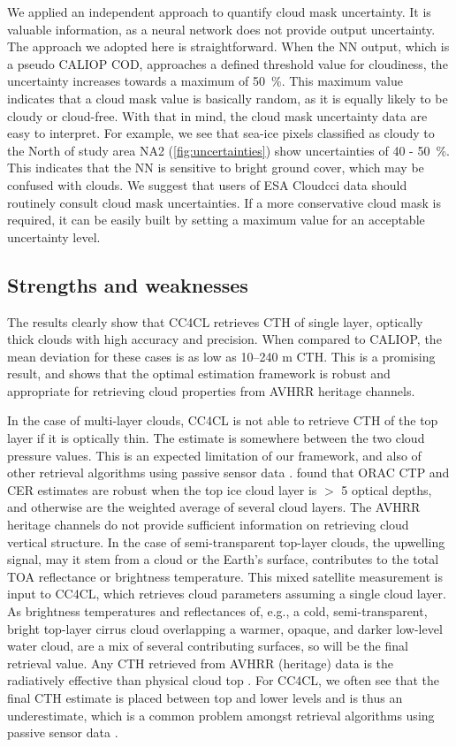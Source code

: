 We applied an independent approach to quantify cloud mask uncertainty. It is valuable information, as a neural network does not provide output uncertainty. The approach we adopted here is straightforward. When the NN output, which is a pseudo CALIOP COD, approaches a defined threshold value for cloudiness, the uncertainty increases towards a maximum of 50~\%. This maximum value indicates that a cloud mask value is basically random, as it is equally likely to be cloudy or cloud-free. With that in mind, the cloud mask uncertainty data are easy to interpret. For example, we see that sea-ice pixels classified as cloudy to the North of study area NA2 (\cref{fig:uncertainties}) show uncertainties of 40 - 50~\%. This indicates that the NN is sensitive to bright ground cover, which may be confused with clouds. We suggest that users of ESA Cloud\textunderscore cci data should routinely consult cloud mask uncertainties. If a more conservative cloud mask is required, it can be easily built by setting a maximum value for an acceptable uncertainty level.

\subsection{Strengths and weaknesses}

The results clearly show that CC4CL retrieves CTH of single layer, optically thick clouds with high accuracy and precision. When compared to CALIOP, the mean deviation for these cases is as low as 10--240 m CTH. This is a promising result, and shows that the optimal estimation framework is robust and appropriate for retrieving cloud properties from AVHRR heritage channels. 

In the case of multi-layer clouds, CC4CL is not able to retrieve CTH of the top layer if it is optically thin. The estimate is somewhere between the two cloud pressure values. This is an expected limitation of our framework, and also of other retrieval algorithms using passive sensor data \citep{Holz08,Karlsson10}. \citet{Poulsen12} found that ORAC CTP and CER estimates are robust when the top ice cloud layer is $>$ 5 optical depths, and otherwise are the weighted average of several cloud layers. The AVHRR heritage channels do not provide sufficient information on retrieving cloud vertical structure. In the case of semi-transparent top-layer clouds, the upwelling signal, may it stem from a cloud or the Earth's surface, contributes to the total TOA reflectance or brightness temperature. This mixed satellite measurement is input to CC4CL, which retrieves cloud parameters assuming a single cloud layer. As brightness temperatures and reflectances of, e.g., a cold, semi-transparent, bright top-layer cirrus cloud overlapping a warmer, opaque, and darker low-level water cloud, are a mix of several contributing surfaces, so will be the final retrieval value. Any CTH retrieved from AVHRR (heritage) data is the radiatively effective than physical cloud top \citep{Karlsson13}. For CC4CL, we often see that the final CTH estimate is placed between top and lower levels and is thus an underestimate, which is a common problem amongst retrieval algorithms using passive sensor data \citep{Watts11,Holz08,Karlsson13}. 

